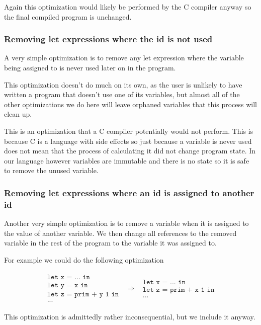 \documentclass[a4paper]{article}
\newcommand{\optimization}[2]{
	\[
		\begin{array}{rcl}
			#1 & \Rightarrow & #2
		\end{array}
	\]
}
\begin{document}
Again this optimization would likely be performed by the C compiler anyway so the final compiled program is unchanged.




\subsubsection{Removing let expressions where the id is not used}

A very simple optimization is to remove any let expression where the variable being assigned to is never used later on in the program.

This optimization doesn't do much on its own, as the user is unlikely to have written a program that doesn't use one of its variables, but almost all of the other optimizations we do here will leave orphaned variables that this process will clean up.

This is an optimization that a C compiler potentially would not perform. This is because C is a language with side effects so just because a variable is never used does not mean that the process of calculating it did not change program state. In our language however variables are immutable and there is no state so it is safe to remove the unused variable.




\subsubsection{Removing let expressions where an id is assigned to another id}

Another very simple optimization is to remove a variable when it is assigned to the value of another variable. We then change all references to the removed variable in the rest of the program to the variable it was assigned to.

For example we could do the following optimization
\optimization{
	\begin{array}{l}
		\texttt{let x = ... in} \\
		\texttt{let y = x in} \\
		\texttt{let z = prim + y 1 in}\\
		\texttt{...}
	\end{array}
}{
	\begin{array}{l}
		\texttt{let x = ... in} \\
		\texttt{let z = prim + x 1 in}\\
		\texttt{...}
	\end{array}
}
This optimization is admittedly rather inconsequential, but we include it anyway.
\end{document}
